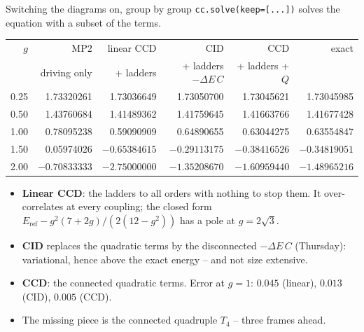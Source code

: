 \documentclass[aspectratio=169,10pt]{beamer}
\newcommand{\Eref}{E_{\mathrm{ref}}}
\begin{document}
\begin{frame}[shrink=6]{Switching the diagrams on, group by group}
\small
\texttt{cc.solve(keep=[...])} solves the equation with a subset of the terms.
\begin{center}
\renewcommand{\arraystretch}{1.2}
\begin{tabular}{rrrrrr}
\toprule
$g$ & MP2 & linear CCD & CID & CCD & exact\\
 & {\footnotesize driving only} & {\footnotesize + ladders} & {\footnotesize + ladders $-\Delta E\,C$} & {\footnotesize + ladders + $Q$} & \\
\midrule
0.25 & 1.73320261 & 1.73036649 & 1.73050700 & 1.73045621 & 1.73045985\\
0.50 & 1.43760684 & 1.41489362 & 1.41759645 & 1.41663766 & 1.41677428\\
1.00 & 0.78095238 & 0.59090909 & 0.64890655 & 0.63044275 & 0.63554847\\
1.50 & 0.05974026 & $-0.65384615$ & $-0.29113175$ & $-0.38416526$ & $-0.34819051$\\
2.00 & $-0.70833333$ & $-2.75000000$ & $-1.35208670$ & $-1.60959440$ & $-1.48965216$\\
\bottomrule
\end{tabular}
\end{center}
\begin{itemize}
\item \textbf{Linear CCD}: the ladders to all orders with nothing to stop them. It over-correlates at every coupling; the closed form $\Eref-g^2(7+2g)/(2(12-g^2))$ has a pole at $g=2\sqrt3$.
\item \textbf{CID} replaces the quadratic terms by the disconnected $-\Delta E\,C$ (Thursday): variational, hence above the exact energy -- and not size extensive.
\item \textbf{CCD}: the connected quadratic terms. Error at $g=1$: $0.045$ (linear), $0.013$ (CID), $0.005$ (CCD).
\item The missing piece is the connected quadruple $T_4$ -- three frames ahead.
\end{itemize}
\end{frame}
\end{document}
